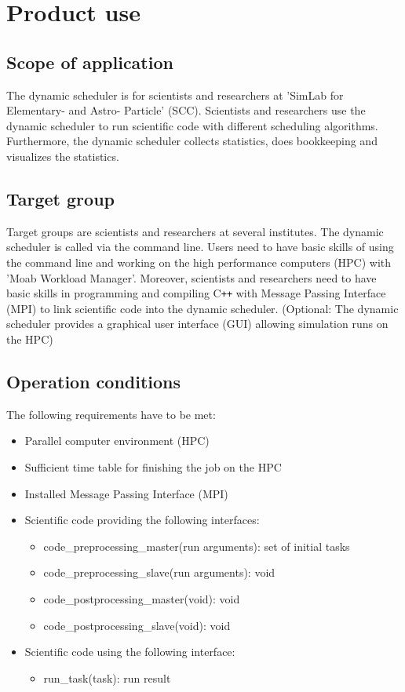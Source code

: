 \section{Product use}

\subsection{Scope of application}
The dynamic scheduler is for scientists and researchers at 'SimLab for Elementary- and Astro- Particle' (SCC). Scientists and researchers use the dynamic scheduler to run scientific code with different scheduling algorithms. Furthermore, the dynamic scheduler collects statistics, does bookkeeping and visualizes the statistics.


\subsection{Target group}
Target groups are scientists and researchers at several institutes. The dynamic scheduler is called via the command line. Users need to have basic skills of using the command line and working on the high performance computers (HPC) with 'Moab Workload Manager'. Moreover, scientists and researchers need to have basic skills in programming and compiling C\texttt{++} with Message Passing Interface (MPI) to link scientific code into the dynamic scheduler.
(Optional: The dynamic scheduler provides a graphical user interface (GUI) allowing simulation runs on the HPC)


\subsection{Operation conditions}

The following requirements have to be met:
\begin{itemize}
	\item Parallel computer environment (HPC)
	\item Sufficient time table for finishing the job on the HPC
	\item Installed Message Passing Interface (MPI)
	\item Scientific code providing the following interfaces:
		\begin{itemize}
			\item code\_preprocessing\_master(run arguments): set of initial tasks
			\item code\_preprocessing\_slave(run arguments): void
			\item  code\_postprocessing\_master(void): void
			\item  code\_postprocessing\_slave(void): void
		\end{itemize}
	\item Scientific code using the following interface:
		\begin{itemize}
			\item run\_task(task): run result
		\end{itemize}
\end{itemize}
